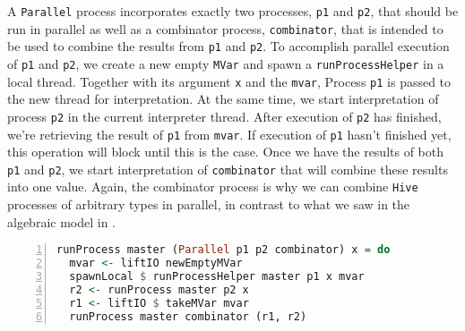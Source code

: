 A \texttt{Parallel} process incorporates exactly two processes, \texttt{p1} and \texttt{p2}, that should be run in parallel as well as a combinator process, \texttt{combinator}, that is intended to be used to combine the results from \texttt{p1} and \texttt{p2}. To accomplish parallel execution of \texttt{p1} and \texttt{p2}, we create a new empty \texttt{MVar} and spawn a \texttt{runProcessHelper} in a local thread. Together with its argument \texttt{x} and the \texttt{mvar}, Process \texttt{p1} is passed to the new thread for interpretation. At the same time, we start interpretation of process \texttt{p2} in the current interpreter thread. After execution of \texttt{p2} has finished, we're retrieving the result of \texttt{p1} from \texttt{mvar}. If execution of \texttt{p1} hasn't finished yet, this operation will block until this is the case. Once we have the results of both \texttt{p1} and \texttt{p2}, we start interpretation of \texttt{combinator} that will combine these results into one value. Again, the combinator process is why we can combine \texttt{Hive} processes of arbitrary types in parallel, in contrast to what we saw in the algebraic model in .
\begin{lstlisting}[language=Haskell,caption=Implementation of the interpreter for \texttt{Parallel} processes.,numbers=left,frame=bt]
runProcess master (Parallel p1 p2 combinator) x = do
  mvar <- liftIO newEmptyMVar
  spawnLocal $ runProcessHelper master p1 x mvar
  r2 <- runProcess master p2 x
  r1 <- liftIO $ takeMVar mvar
  runProcess master combinator (r1, r2)
\end{lstlisting}

